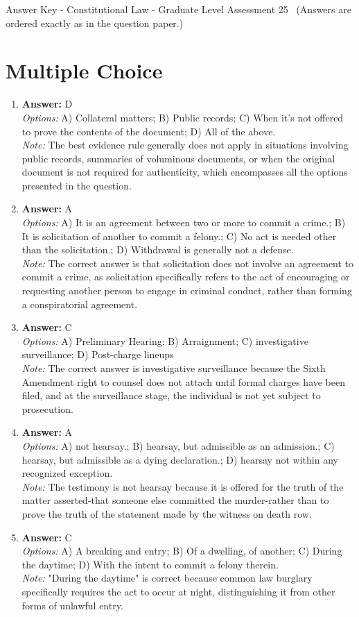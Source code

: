 \documentclass[12pt]{article}
\begin{document}
\begin{center}
Answer Key - Constitutional Law - Graduate Level Assessment 25 \
\small (Answers are ordered exactly as in the question paper.)
\end{center}

\section*{Multiple Choice}
\begin{enumerate}[label=\arabic*.]
\item \textbf{Answer:} D
\\ \textit{Options:} A) Collateral matters; B) Public records; C) When it's not offered to prove the contents of the document; D) All of the above.
\\ \textit{Note:} The best evidence rule generally does not apply in situations involving public records, summaries of voluminous documents, or when the original document is not required for authenticity, which encompasses all the options presented in the question.
\item \textbf{Answer:} A
\\ \textit{Options:} A) It is an agreement between two or more to commit a crime.; B) It is solicitation of another to commit a felony.; C) No act is needed other than the solicitation.; D) Withdrawal is generally not a defense.
\\ \textit{Note:} The correct answer is that solicitation does not involve an agreement to commit a crime, as solicitation specifically refers to the act of encouraging or requesting another person to engage in criminal conduct, rather than forming a conspiratorial agreement.
\item \textbf{Answer:} C
\\ \textit{Options:} A) Preliminary Hearing; B) Arraignment; C) investigative surveillance; D) Post-charge lineups
\\ \textit{Note:} The correct answer is investigative surveillance because the Sixth Amendment right to counsel does not attach until formal charges have been filed, and at the surveillance stage, the individual is not yet subject to prosecution.
\item \textbf{Answer:} A
\\ \textit{Options:} A) not hearsay.; B) hearsay, but admissible as an admission.; C) hearsay, but admissible as a dying declaration.; D) hearsay not within any recognized exception.
\\ \textit{Note:} The testimony is not hearsay because it is offered for the truth of the matter asserted-that someone else committed the murder-rather than to prove the truth of the statement made by the witness on death row.
\item \textbf{Answer:} C
\\ \textit{Options:} A) A breaking and entry; B) Of a dwelling, of another; C) During the daytime; D) With the intent to commit a felony therein.
\\ \textit{Note:} "During the daytime" is correct because common law burglary specifically requires the act to occur at night, distinguishing it from other forms of unlawful entry.
\end{enumerate}
\end{document}
